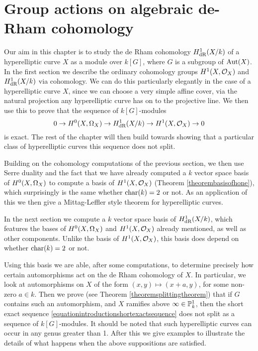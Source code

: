 \chapter{Group actions on algebraic de-Rham cohomology} \label{Chapter:De-Rham cohomology}

Our aim in this chapter is to study the de Rham cohomology $H_{\text {dR}}^1(X/k)$ of a hyperelliptic curve $X$ as a module over $k[G]$, where $G$ is a subgroup of $\operatorname{Aut}(X)$.
In the first section we describe the ordinary cohomology groups $H^1(X,\mathcal{O}_X)$ and $H_{\text {dR}}^1(X/k)$ via \cech cohomology.
We can do this particularly elegantly in the case of a hyperelliptic curve $X$, since we can choose a very simple affine cover, via the natural projection any hyperelliptic curve has on to the projective line.
We then use this to prove that the sequence of $k[G]$-modules
    \begin{equation}\label{equationintroductionshortexactsequence}
    0 \rightarrow {H^0(X,\Omega_X)} \rightarrow H_{\text {dR}}^1(X/k) \rightarrow H^1(X,\mathcal{O}_X) \rightarrow 0
    \end{equation}
is exact.
The rest of the chapter will then build towards showing that a particular class of hyperelliptic curves this sequence does not split.

Building on the \cech cohomology computations of the previous section, we then use Serre duality and the fact that we have already computed a $k$ vector space basis of ${H^0(X,\Omega_X)}$ to compute a basis of $H^1(X,\mathcal{O}_X)$ (Theorem \ref{theorembasisofhone}), which surprisingly is the same whether $\operatorname{char}(k) = 2$ or not.
As an application of this we then give a Mittag-Leffler style theorem for hyperelliptic curves.

In the next section we compute a $k$ vector space basis of $H_{\text {dR}}^1(X/k)$, which features the bases of ${H^0(X,\Omega_X)}$ and $H^1(X,\mathcal{O}_X)$ already mentioned, as well as other components.
Unlike the basis of $H^1(X,\mathcal{O}_X)$, this basis does depend on whether $\operatorname{char}(k) = 2$ or not.

Using this basis we are able, after some computations, to determine precisely how certain automorphisms act on the de Rham cohomology of $X$.
In particular, we look at automorphisms on $X$ of the form $(x,y) \mapsto (x+a, y)$, for some non-zero $a \in k$.
Then we prove (see Theorem \ref{theoremsplittingtheorem}) that if $G$ contains such an automorphism, and $X$ ramifies above $\infty \in {\mathbb P}_k^1$, then the short exact sequence \eqref{equationintroductionshortexactsequence} does not split as a sequence of $k[G]$-modules.
It should be noted that such hyperelliptic curves can occur in any genus greater than 1.
After this we give examples to illustrate the details of what happens when the above suppositions are satisfied.


